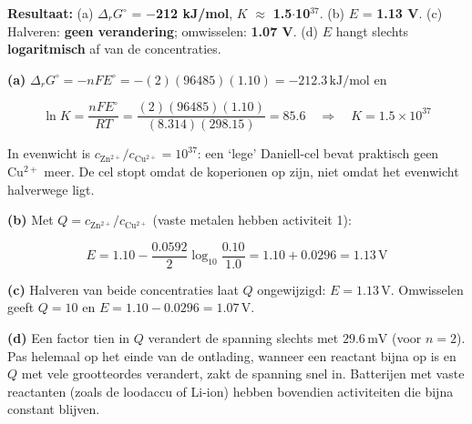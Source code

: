 \begin{oplossing}
\textbf{Resultaat:} (a) \(\Delta_r G^\circ\) = \textbf{\ensuremath{-}212 kJ/mol}, \(K\) \ensuremath{\approx{}} \textbf{1.5\ensuremath{\cdot{}}10\ensuremath{^{37}}}. (b) \(E\) = \textbf{1.13 V}. (c) Halveren: \textbf{geen verandering}; omwisselen: \textbf{1.07 V}. (d) \(E\) hangt slechts \textbf{logaritmisch} af van de concentraties.

\textbf{(a)} \(\Delta_r G^\circ = -nFE^\circ = -(2)(96485)(1.10) = -212.3\,\mathrm{kJ/mol}\) en

\[
\ln K = \frac{nFE^\circ}{RT} = \frac{(2)(96485)(1.10)}{(8.314)(298.15)} = 85.6 \quad\Rightarrow\quad K = 1.5\times10^{37}
\]

In evenwicht is \(c_{\mathrm{Zn^{2+}}}/c_{\mathrm{Cu^{2+}}} = 10^{37}\): een `lege' Daniell-cel bevat praktisch geen \(\mathrm{Cu^{2+}}\) meer. De cel stopt omdat de koperionen op zijn, niet omdat het evenwicht halverwege ligt.

\textbf{(b)} Met \(Q = c_{\mathrm{Zn^{2+}}}/c_{\mathrm{Cu^{2+}}}\) (vaste metalen hebben activiteit 1):

\[
E = 1.10 - \frac{0.0592}{2}\log_{10}\frac{0.10}{1.0} = 1.10 + 0.0296 = 1.13\,\mathrm{V}
\]

\textbf{(c)} Halveren van beide concentraties laat \(Q\) ongewijzigd: \(E = 1.13\,\mathrm{V}\). Omwisselen geeft \(Q = 10\) en \(E = 1.10 - 0.0296 = 1.07\,\mathrm{V}\).

\textbf{(d)} Een factor tien in \(Q\) verandert de spanning slechts met \(29.6\,\mathrm{mV}\) (voor \(n = 2\)). Pas helemaal op het einde van de ontlading, wanneer een reactant bijna op is en \(Q\) met vele grootteordes verandert, zakt de spanning snel in. Batterijen met vaste reactanten (zoals de loodaccu of Li-ion) hebben bovendien activiteiten die bijna constant blijven.
\end{oplossing}

